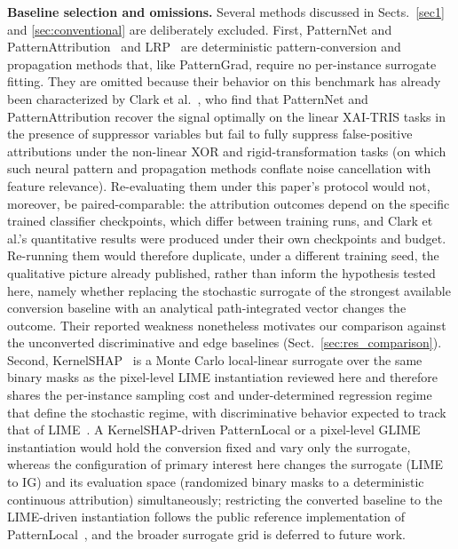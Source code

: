 \documentclass[pdflatex,sn-mathphys-num]{sn-jnl}
\theoremstyle{thmstyleone}
\theoremstyle{thmstyletwo}%
\theoremstyle{thmstylethree}%
\begin{document}
\noindent\textbf{Baseline selection and omissions.} Several methods discussed in Sects.~\ref{sec1} and \ref{sec:conventional} are deliberately excluded. First, PatternNet and PatternAttribution~\cite{kindermans2018learning} and LRP~\cite{bach2015pixel} are deterministic pattern-conversion and propagation methods that, like PatternGrad, require no per-instance surrogate fitting. They are omitted because their behavior on this benchmark has already been characterized by Clark et al.~\cite{clark2024}, who find that PatternNet and PatternAttribution recover the signal optimally on the linear XAI-TRIS tasks in the presence of suppressor variables but fail to fully suppress false-positive attributions under the non-linear XOR and rigid-transformation tasks (on which such neural pattern and propagation methods conflate noise cancellation with feature relevance). Re-evaluating them under this paper's protocol would not, moreover, be paired-comparable: the attribution outcomes depend on the specific trained classifier checkpoints, which differ between training runs, and Clark et al.'s quantitative results were produced under their own checkpoints and budget. Re-running them would therefore duplicate, under a different training seed, the qualitative picture already published, rather than inform the hypothesis tested here, namely whether replacing the stochastic surrogate of the strongest available conversion baseline with an analytical path-integrated vector changes the outcome. Their reported weakness nonetheless motivates our comparison against the unconverted discriminative and edge baselines (Sect.~\ref{sec:res_comparison}). Second, KernelSHAP~\cite{lundberg2017unified} is a Monte Carlo local-linear surrogate over the same binary masks as the pixel-level LIME instantiation reviewed here and therefore shares the per-instance sampling cost and under-determined regression regime that define the stochastic regime, with discriminative behavior expected to track that of LIME~\cite{wilming2022}. A KernelSHAP-driven PatternLocal or a pixel-level GLIME~\cite{tan2023} instantiation would hold the conversion fixed and vary only the surrogate, whereas the configuration of primary interest here changes the surrogate (LIME to IG) and its evaluation space (randomized binary masks to a deterministic continuous attribution) simultaneously; restricting the converted baseline to the LIME-driven instantiation follows the public reference implementation of PatternLocal~\cite{gjoelbye2025}, and the broader surrogate grid is deferred to future work.
\end{document}

